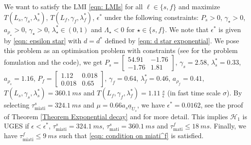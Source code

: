We want to satisfy the LMI \eqref{eqn: LMIs} for all $\ell \in \{s,f\}$ and maximize $T(L_s,\gamma_s, \lambda_s^*)$, $T(L_f,\gamma_f, \lambda_f^*)$, $\epsilon^*$ under the following constraints: $P_s > 0$, $\gamma_\star > 0$, $a_{\rho_\star} > 0$, $\gamma_\star>0$, $\lambda_\star^* \in (0,1)$ and $\Lambda_\star < 0$ for $\star \in \{s,f\}$. We note that $\epsilon^*$ is given by \eqref{eqn: epsilon star} with $d = d^*$ defined by \eqref{eqn: d star exponential}.
%
We pose this problem as an optimisation problem with constraints (see \cite{Github_SPNCS_illustrative_example} for the problem fomulation and the code), we get $P_s = \left[\begin{smallmatrix} 54.91  & -1.76\\ -1.76 & 1.81\end{smallmatrix} \right]$, $\gamma_s = 2.58$, $\lambda_s^* = 0.33$, $a_{\rho_s} = 1.16$, $P_f = \left[\begin{smallmatrix} 1.12  & 0.018\\ 0.018 & 0.65\end{smallmatrix} \right]$, $\gamma_f = 0.64$, $\lambda_f^* = 0.46$, $a_{\rho_f} = 0.41$, $T(L_s,\gamma_s, \lambda_s^*) = 360.1 \ ms$ and $T(L_f,\gamma_f, \lambda_f^*) = 1.11 \ \tfrac{s}{\epsilon}$ (in fast time scale $\sigma$). By selecting $\tau_{\text{miati}}^{s} = 324.1 \ ms$ and $\mu = 0.66 a_s \underline{a}_{U_s}$, we have $\epsilon^* = 0.0162$, see the proof of Theorem \ref{Theorem Exponential decay} and \cite{Github_SPNCS_illustrative_example} for more detail.
%
%
This implies $\mathcal{H}_1$ is UGES if $\epsilon < \epsilon^*$, $\tau_{\text{miati}}^s = 324.1 \ ms$, $\tau_{\text{mati}}^s = 360.1 \ ms$ and $\tau_{\text{mati}}^f \leq 18 \ ms$. Finally, we have $\tau_{\text{miati}}^f \leq 9\ ms$ such that \eqref{eqn: condition on miati^f} is satisfied.





















